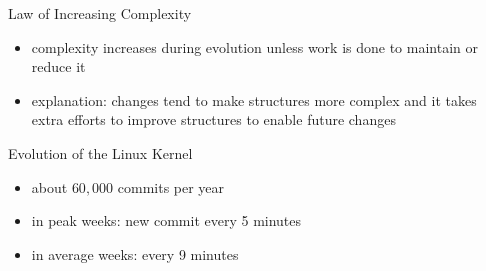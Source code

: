 \begin{frame}{\insertsubsection}
	\begin{fancycolumns}
		\begin{definition}{Law of Increasing Complexity\mysource{\lehmanslaws}}
			\begin{itemize}
				\item complexity increases during evolution unless work is done to maintain or reduce it %
				\item explanation: changes tend to make structures more complex and it takes extra efforts to improve structures to enable future changes
			\end{itemize}
		\end{definition}
		\begin{example}{Evolution of the Linux Kernel}
			\begin{itemize}
				\item about $60,000$ commits per year
				\item in peak weeks: new commit every 5 minutes
				\item in average weeks: every 9 minutes
			\end{itemize}
		\end{example}
		\nextcolumn
	\end{fancycolumns}
\end{frame}


